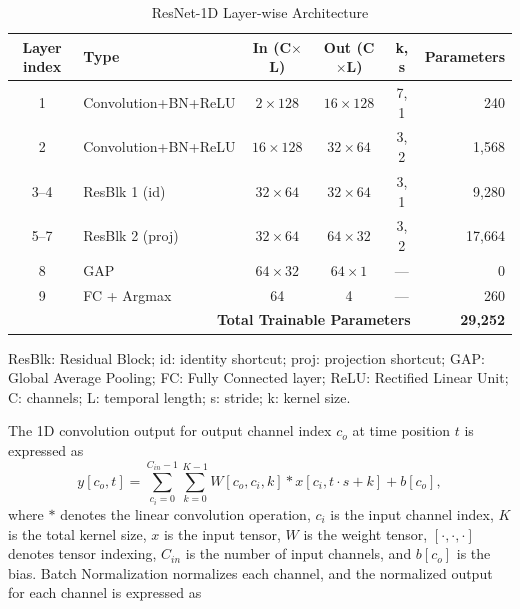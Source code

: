 \documentclass[conference]{IEEEtran}
\begin{document}
\begin{table}[t]
\renewcommand{\arraystretch}{1.3}
\caption{ResNet-1D Layer-wise Architecture}
\begin{center}
\scriptsize
\setlength{\tabcolsep}{2.5pt}
\begin{tabular}{c l c c c r}
\toprule
\textbf{Layer index} & \textbf{Type} & \textbf{In (C$\times$L)} & \textbf{Out (C$\times$L)} & \textbf{k, s} & \textbf{Parameters} \\
\midrule
1 & Convolution+BN+ReLU & $2\!\times\!128$ & $16\!\times\!128$ & 7, 1 & 240 \\
2 & Convolution+BN+ReLU & $16\!\times\!128$ & $32\!\times\!64$ & 3, 2 & 1,568 \\
3--4 & ResBlk 1 (id) & $32\!\times\!64$ & $32\!\times\!64$ & 3, 1 & 9,280 \\
5--7 & ResBlk 2 (proj) & $32\!\times\!64$ & $64\!\times\!32$ & 3, 2 & 17,664 \\
8 & GAP & $64\!\times\!32$ & $64\!\times\!1$ & --- & 0 \\
9 & FC + Argmax & 64 & 4 & --- & 260 \\
\midrule
 & \multicolumn{4}{r}{\textbf{Total Trainable Parameters}} & \textbf{29,252} \\
\bottomrule
\end{tabular}
\label{tab:layerwise}
\end{center}
\footnotesize{ResBlk: Residual Block;
id: identity shortcut; proj: projection shortcut; GAP: Global Average Pooling;
FC: Fully Connected layer; ReLU: Rectified Linear Unit; C: channels; L: temporal length; s: stride; k: kernel size.}
\end{table}
The 1D convolution output for output channel index $c_o$ at time position $t$ is expressed as
\begin{equation}
y[c_o, t] = \sum_{c_i=0}^{C_{in}-1} \sum_{k=0}^{K-1} W[c_o, c_i, k] \ast x[c_i, t \cdot s + k] + b[c_o],
\label{eq:conv1d}
\end{equation}
where $\ast$ denotes the linear convolution operation, $c_i$ is the input channel index, $K$ is the total kernel size, $x$ is the input tensor, $W$ is the weight tensor, $[ \cdot, \cdot,\cdot]$ denotes tensor indexing, $C_{in}$ is the number of input channels, and $b[c_o]$ is the bias. Batch Normalization normalizes each channel, and the normalized output for each channel is expressed as
\end{document}
